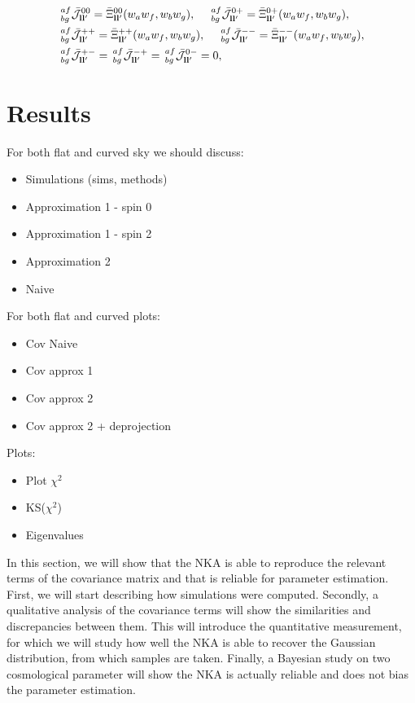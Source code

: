 \documentclass[a4paper,11pt]{article}
\begin{document}
      \begin{align}
        &\,^{af}_{bg}\bar{\mathcal{J}}^{00}_{{\bf l}{\bf l}'}=\bar{\Xi}^{00}_{{\bf l}{\bf l}'}(w_aw_f,w_bw_g),\hspace{12pt}
         \,^{af}_{bg}\bar{\mathcal{J}}^{0+}_{{\bf l}{\bf l}'}=\bar{\Xi}^{0+}_{{\bf l}{\bf l}'}(w_aw_f,w_bw_g),\\
        &\,^{af}_{bg}\bar{\mathcal{J}}^{++}_{{\bf l}{\bf l}'}=\bar{\Xi}^{++}_{{\bf l}{\bf l}'}(w_aw_f,w_bw_g),\hspace{12pt}
         \,^{af}_{bg}\bar{\mathcal{J}}^{--}_{{\bf l}{\bf l}'}=\bar{\Xi}^{--}_{{\bf l}{\bf l}'}(w_aw_f,w_bw_g),\\
        &\,^{af}_{bg}\bar{\mathcal{J}}^{+-}_{{\bf l}{\bf l}'}=
         \,^{af}_{bg}\bar{\mathcal{J}}^{-+}_{{\bf l}{\bf l}'}=
         \,^{af}_{bg}\bar{\mathcal{J}}^{0-}_{{\bf l}{\bf l}'}=0,
      \end{align}







\section{Results}
For both flat and curved sky we should discuss:
\begin{itemize}
\item Simulations (sims, methods)
\item Approximation 1 - spin 0
\item Approximation 1 - spin 2
\item Approximation 2
\item Naive
\end{itemize}

For both flat and curved plots:
\begin{itemize}
\item Cov Naive
\item Cov approx 1
\item Cov approx 2
\item Cov approx 2 + deprojection
\end{itemize}

Plots:
\begin{itemize}
\item Plot $\chi^2$
\item KS($\chi^2$)
\item Eigenvalues
\end{itemize}

In this section, we will show that the NKA is able to reproduce the relevant
terms of the covariance matrix and that is reliable for parameter estimation.
First, we will start describing how simulations were computed. Secondly, a
qualitative analysis of the covariance terms will show the similarities and
discrepancies between them. This will introduce the quantitative measurement,
for which we will study how well the NKA is able to recover the Gaussian
distribution, from which samples are taken. Finally, a Bayesian study on two
cosmological parameter will show the NKA is actually reliable and does not
bias the parameter estimation.
\end{document}
